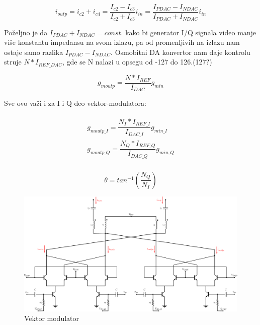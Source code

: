 \documentclass[journal,twocolumn,letterpaper]{IEEEJERM}
\begin{document}
\begin{equation*}
  \label{eqn:out_current}
    i_{outp} = i_{c2} + i_{c4} = \dfrac{I_{c2} - I_{c3}}{I_{c2} + I_{c3}}i_{in} = \dfrac{I_{PDAC} - I_{NDAC}}{I_{PDAC} + I_{NDAC}}i_{in} 
\end{equation*}


Poželjno je da $I_{PDAC} + I_{NDAC} = const.$ kako bi generator I/Q signala video manje više konstantu impedansu na svom izlazu, pa od promenljivih na izlazu nam ostaje samo razlika $I_{PDAC} - I_{NDAC}$. Osmobitni DA konvertor nam daje kontrolu struje $N * I_{REF\_DAC}$, gde se N nalazi u opsegu od -127 do 126.(127?)

\begin{equation}
  \label{eqn:gm_out}
    g_{moutp} = \dfrac{N*I_{REF}}{I_{DAC}} g_{min}
\end{equation}

Sve ovo važi i za I i Q deo vektor-modulatora:

\begin{align}
  \label{eqn:gm_IQ}
  \begin{split}
    g_{moutp\_I} = \dfrac{N_I*I_{REF\_I}}{I_{DAC\_I}} g_{min\_I} \\
    g_{moutp\_Q} = \dfrac{N_Q*I_{REF\_Q}}{I_{DAC\_Q}} g_{min\_Q} \\
  \end{split}
\end{align}



\begin{equation}
  \label{eqn:out_phase}
  \theta = tan^{-1}(\dfrac{N_{Q}}{N_{I}})
\end{equation}


\begin{figure}[!htbp]
  \centering
  \includegraphics[width=\linewidth]{vmod.pdf}
  \caption{Vektor modulator}
  \label{fig:vmod}
\end{figure}
\end{document}

